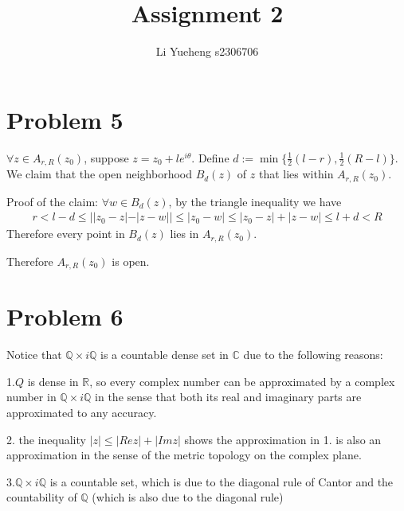 \documentclass{article}
\begin{document}
\title{Assignment 2}
\author{Li Yueheng s2306706}

\maketitle


\section*{Problem 5}


$\forall z \in A_{r,R}(z_0)$, suppose $z=z_0+le^{i\theta}$. Define $d:=\min\{{\frac{1}{2}(l-r),\frac{1}{2}(R-l) }\}$. We claim that the open neighborhood $B_d(z)$ of $z$ that lies within $A_{r,R}(z_0)$.

Proof of the claim: $\forall w\in B_{d}(z)$, by the triangle inequality we have
\begin{align*}
	r< l-d \leq ||z_0-z|-|z-w|| \leq|z_0-w|\leq |z_0-z|+|z-w|\leq l+d <R
\end{align*}
Therefore every point in $B_d(z)$ lies in $A_{r,R}(z_0)$.

Therefore $A_{r,R}(z_0)$ is open.

\section*{Problem 6}
Notice that $\mathbb{Q}\times i\mathbb{Q}$ is a countable dense set in $\mathbb{C}$ due to the following reasons:

1.$Q$ is dense in $\mathbb{R}$, so every complex number can be approximated by a complex number in $\mathbb{Q}\times i\mathbb{Q}$ in the sense that both its real and imaginary parts are approximated to any accuracy.

2. the inequality $|z|\leq |Rez|+|Imz|$ shows the approximation in 1. is also an approximation in the sense of the metric topology on the complex plane.

3.$\mathbb{Q}\times i\mathbb{Q}$ is a countable set, which is due to the diagonal rule of Cantor and the countability of $\mathbb{Q}$ (which is also due to the diagonal rule)
\end{document}
